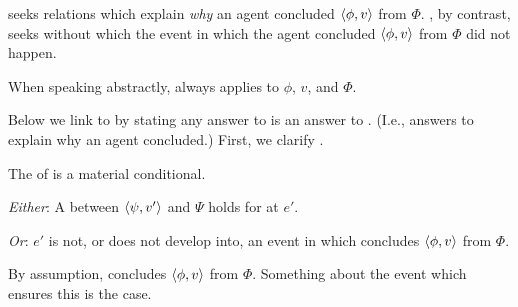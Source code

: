 \begin{note}
  \qWhy{} seeks relations which explain \emph{why} an agent concluded \(\langle \phi, v \rangle\) from \(\Phi\).
  \qWhyV{}, by contrast, seeks \ros{} without which the event in which the agent concluded \(\langle \phi, v \rangle\) from \(\Phi\) did not happen.
\end{note}

\begin{note}
  \begin{notationList}
  \item
    When speaking abstractly, \qWhyV{} always applies to \(\phi\), \(v\), and \(\Phi\).
  \end{notationList}
\end{note}

\begin{note}
  Below we link \qWhyV{} to \qWhy{} by stating any answer to \qWhyV{} is an answer to \qWhy{}.
  (I.e., answers to \qWhyV{} explain why an agent concluded.)
  First, we clarify \qWhyV{}.
\end{note}

\begin{note}
  The \itc{} of \qWhyV{} is a material conditional.
  \begin{itenum}
  \item[\emph{Either}:]
    A  between \(\langle \psi, v' \rangle\) and \(\Psi\) holds for \vAgent{} at \(e'\).
  \item[\emph{Or}:]
    \(e'\) is not, or does not develop into, an event in which \vAgent{} concludes \(\langle \phi, v \rangle\) from \(\Phi\).
  \end{itenum}

  By assumption, \vAgent{} concludes \(\langle \phi, v \rangle\) from \(\Phi\).
  Something about the event which ensures this is the case.
\end{note}


